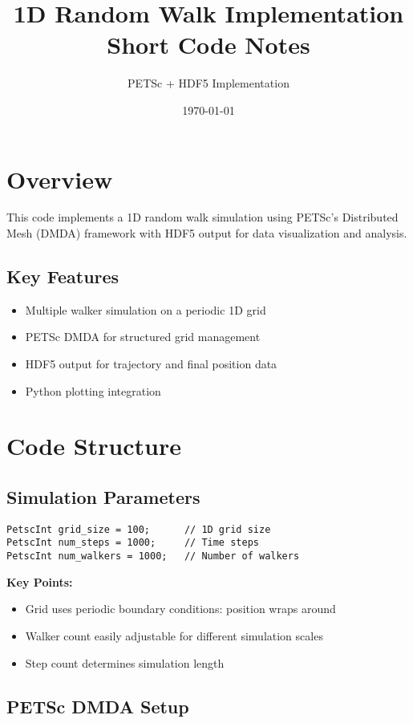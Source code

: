 \documentclass[11pt,a4paper]{article}
\title{1D Random Walk Implementation\\Short Code Notes}
\author{PETSc + HDF5 Implementation}
\date{\today}
\begin{document}
\maketitle

\section{Overview}

This code implements a 1D random walk simulation using PETSc's Distributed Mesh (DMDA) framework with HDF5 output for data visualization and analysis.

\subsection{Key Features}
\begin{itemize}
    \item Multiple walker simulation on a periodic 1D grid
    \item PETSc DMDA for structured grid management
    \item HDF5 output for trajectory and final position data
    \item Python plotting integration
\end{itemize}

\section{Code Structure}

\subsection{Simulation Parameters}
\begin{lstlisting}[caption=Core simulation parameters]
PetscInt grid_size = 100;      // 1D grid size
PetscInt num_steps = 1000;     // Time steps
PetscInt num_walkers = 1000;   // Number of walkers
\end{lstlisting}

\textbf{Key Points:}
\begin{itemize}
    \item Grid uses periodic boundary conditions: position wraps around
    \item Walker count easily adjustable for different simulation scales
    \item Step count determines simulation length
\end{itemize}

\subsection{PETSc DMDA Setup}
\end{document}
